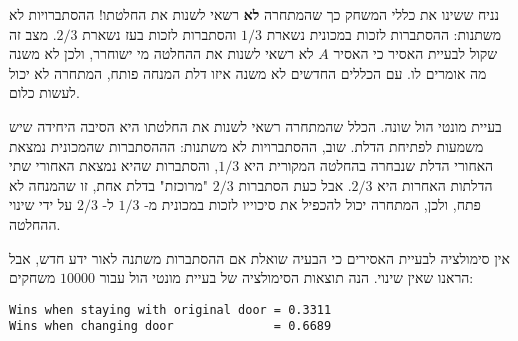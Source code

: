 נניח ששינו את כללי המשחק כך שהמתחרה 
\textbf{לא}
רשאי לשנות את החלטתו! ההסתברויות לא משתנות: ההסתברות לזכות במכונית נשארת
$1/3$
והסתברות לזכות בעז נשארת
$2/3$.
מצב זה שקול לבעיית האסיר כי האסיר 
$A$
לא רשאי לשנות את ההחלטה מי ישוחרר, ולכן לא משנה מה אומרים לו. עם הכללים החדשים לא משנה איזו דלת המנחה פותח, המתחרה לא יכול לעשות כלום.

בעיית מונטי הול שונה. הכלל שהמתחרה רשאי לשנות את החלטתו היא הסיבה היחידה שיש משמעות לפתיחת הדלת. שוב, ההסתברויות לא משתנות: הההסתברות שהמכונית נמצאת האחורי הדלת שנבחרה בהחלטה המקורית היא
$1/3$,
והסתברות שהיא נמצאת האחורי שתי הדלתות האחרות היא
$2/3$.
אבל כעת הסתברות
$2/3$
"מרוכזת" בדלת אחת, זו שהמנחה לא פתח, ולכן, המתחרה יכול להכפיל את סיכוייו לזכות במכונית מ-%
$1/3$
ל-%
$2/3$
על ידי שינוי ההחלטה.


\sml{}

אין סימולציה לבעיית האסירים כי הבעיה שואלת אם ההסתברות משתנה לאור ידע חדש, אבל הראנו שאין שינוי. הנה תוצאות הסימולציה של בעיית מונטי הול עבור 
$10000$
משחקים:

\begin{verbatim}
Wins when staying with original door = 0.3311
Wins when changing door              = 0.6689
\end{verbatim}



